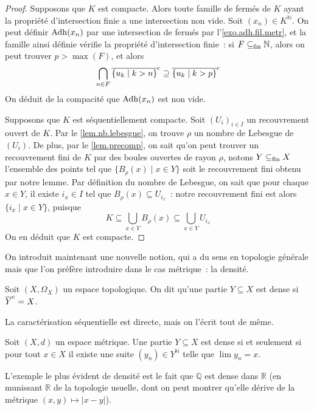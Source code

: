 \begin{proof}
  Supposons que $K$ est compacte. Alors toute famille de fermés de $K$ ayant
  la propriété d'intersection finie a une intersection non vide. Soit
  $(x_n)\in K^{\mathbb N}$. On peut définir
  $\operatorname{Adh}(x_n)$ par une intersection de fermés par l'\cref{exo.adh.fil.metr}, et
  la famille ainsi définie vérifie la propriété d'intersection finie~: si
  $F\subseteq_{\mathrm{fin}} \mathbb N$, alors on peut trouver $p > \max(F)$, et alors
  \[\bigcap_{n \in F}\overline{\{u_k\mid k > n\}}^{\mathrm c} \supseteq
  \overline{\{u_k\mid k > p\}}^{\mathrm c}\]
  On déduit de la compacité que $\operatorname{Adh}(x_n)$ est non vide.
  
  Supposons que $K$ est séquentiellement compacte. Soit $(U_i)_{i\in I}$ un
  recouvrement ouvert de $K$. Par le \cref{lem.nb.lebesgue}, on trouve $\rho$ un
  nombre de Lebesgue de $(U_i)$. De plus, par le \cref{lem.precomp}, on sait
  qu'on peut trouver un recouvrement fini de $K$ par des boules ouvertes de
  rayon $\rho$, notons $Y \subseteq_{\mathrm{fin}} X$ l'ensemble des points tel que
  $\{B_\rho(x)\mid x \in Y\}$ soit le recouvrement fini obtenu par notre lemme.
  Par définition du nombre de Lebesgue, on sait que pour chaque $x \in Y$, il
  existe $i_x \in I$ tel que $B_\rho(x) \subseteq U_{i_x}$~: notre recouvrement
  fini est alors $\{i_x\mid x \in Y\}$, puisque
  \[K\subseteq \bigcup_{x \in Y} B_\rho(x) \subseteq \bigcup_{x \in Y} U_{i_x}\]
  On en déduit que $K$ est compacte.
\end{proof}

On introduit maintenant une nouvelle notion, qui a du sens en topologie générale
mais que l'on préfère introduire dans le cas métrique~: la densité.

\begin{definition}[Densité]
  Soit $(X,\Omega_X)$ un espace topologique. On dit qu'une partie
  $Y\subseteq X$ est dense si $\overline{Y}^{\mathrm c} = X$.
\end{definition}

La caractérisation séquentielle est directe, mais on l'écrit tout de même.

\begin{property}
  Soit $(X,d)$ un espace métrique. Une partie $Y\subseteq X$ est dense si et
  seulement si pour tout $x\in X$ il existe une suite $(y_n)\in Y^\mathbb N$
  telle que $\lim y_n = x$.
\end{property}

\begin{example}
  L'exemple le plus évident de densité est le fait que $\mathbb Q$ est dense
  dans $\mathbb R$ (en munissant $\mathbb R$ de la topologie usuelle, dont on
  peut montrer qu'elle dérive de la métrique $(x,y)\mapsto |x-y|$).
\end{example}

